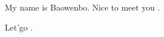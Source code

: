 \documentclass{article}
\begin{document}
My name is Baowenbo.
Nice to meet you .

Let'go .
\end{document}
